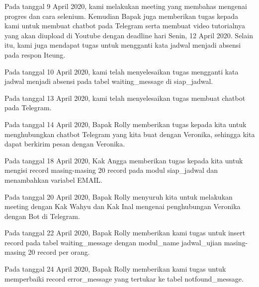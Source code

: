 \documentclass[a4paper, 12 pt]{article}
\begin{document}
            \par Pada tanggal 9 April 2020, kami melakukan meeting yang membahas mengenai progres dan cara selenium. Kemudian Bapak juga memberikan tugas kepada kami untuk membuat chatbot pada Telegram serta membuat video tutorialnya yang akan diupload di Youtube dengan deadline hari Senin, 12 April 2020. Selain itu, kami juga mendapat tugas untuk mengganti kata jadwal menjadi absensi pada respon Iteung. \\
            
            \par Pada tanggal 10 April 2020, kami telah menyelesaikan tugas mengganti kata jadwal menjadi absensi pada tabel waiting\_message di siap\_jadwal. \\
            
            \par Pada tanggal 13 April 2020, kami telah menyelesaikan tugas membuat chatbot pada Telegram. \\
            
            \par Pada tanggal 14 April 2020, Bapak Rolly memberikan tugas kepada kita untuk menghubungkan chatbot Telegram yang kita buat dengan Veronika, sehingga kita dapat berkirim pesan dengan Veronika. \\
            
            \par Pada tanggal 18 April 2020, Kak Angga memberikan tugas kepada kita untuk mengisi record masing-masing 20 record pada modul siap\_jadwal dan menambahkan variabel EMAIL. \\
            
            \par Pada tanggal 20 April 2020, Bapak Rolly menyuruh kita untuk melakukan meeting dengan Kak Wahyu dan Kak Inal mengenai penghubungan Veronika dengan Bot di Telegram. \\
            
            \par Pada tanggal 22 April 2020, Bapak Rolly memberikan kami tugas untuk insert record pada tabel waiting\_message dengan modul\_name jadwal\_ujian masing-masing 20 record per orang. \\
            
            \par Pada tanggal 24 April 2020, Bapak Rolly memberikan kami tugas untuk memperbaiki record error\_message yang tertukar ke tabel notfound\_message. \\
            
\end{document}
